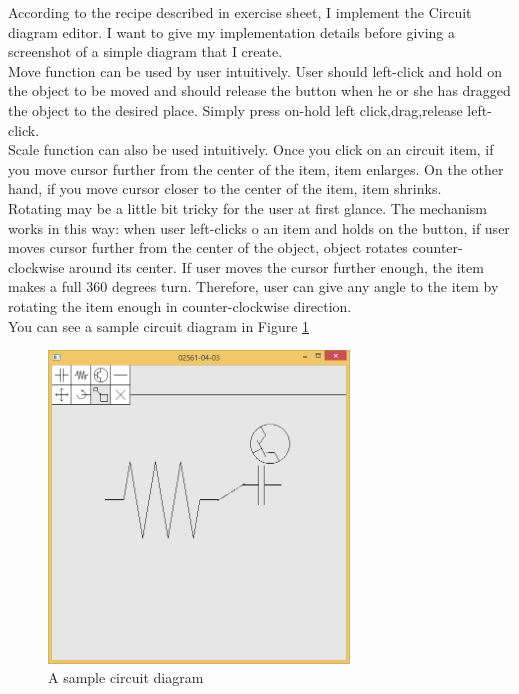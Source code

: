 According to the recipe described in exercise sheet, I implement the Circuit diagram editor. I want to give my implementation details before giving a screenshot of a simple diagram that I create. \\
Move function can be used by user intuitively. User should left-click and hold on the object to be moved and should release the button when he or she has dragged the object to the desired place. Simply press on-hold left click,drag,release left-click.\\
Scale function can also be used intuitively. Once you click on an circuit item, if you move cursor further from the center of the item, item enlarges. On the other hand, if you move cursor closer to the center of the item, item shrinks. \\
Rotating may be a little bit tricky for the user at first glance. The mechanism works in this way: when user left-clicks o an item and holds on the button, if user moves cursor further from the center of the object, object rotates counter-clockwise around its center. If user moves the cursor further enough, the item makes a full 360 degrees turn. Therefore, user can give any angle to the item by rotating the item enough in counter-clockwise direction.\\
You can see a sample circuit diagram in Figure \ref{fig:5-3}


\begin{figure}[hp]
\centering
\includegraphics[width=8cm]{../Screenshots/ex-5/3.png}
\caption{A sample circuit diagram}
\label{fig:5-3}
\end{figure}




